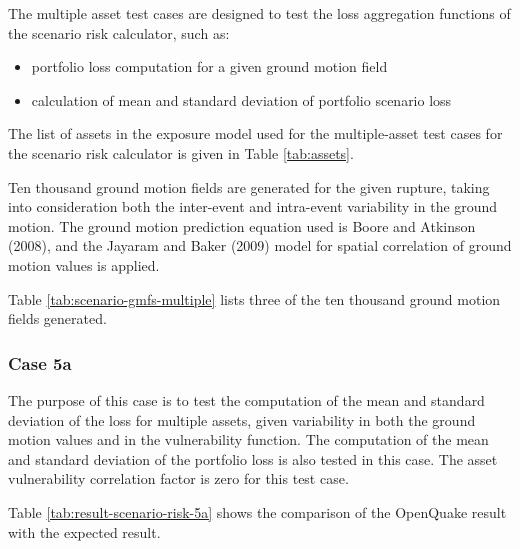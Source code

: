 The multiple asset test cases are designed to test the loss aggregation functions of the scenario risk calculator, such as:

\begin{itemize}
\item portfolio loss computation for a given ground motion field
\item calculation of mean and standard deviation of portfolio scenario loss
\end{itemize}



The list of assets in the exposure model used for the multiple-asset test cases for the scenario risk calculator is given in Table \ref{tab:assets}.

Ten thousand ground motion fields are generated for the given rupture, taking into consideration both the inter-event and intra-event variability in the ground motion. The ground motion prediction equation used is Boore and Atkinson (2008), and the Jayaram and Baker (2009) model for spatial correlation of ground motion values is applied.



Table \ref{tab:scenario-gmfs-multiple} lists three of the ten thousand ground motion fields generated.

\subsubsection{Case 5a}
The purpose of this case is to test the computation of the mean and standard deviation of the loss for multiple assets, given variability in both the ground motion values and in the vulnerability function. The computation of the mean and standard deviation of the portfolio loss is also tested in this case. The asset vulnerability correlation factor is zero for this test case.




Table \ref{tab:result-scenario-risk-5a} shows the comparison of the OpenQuake result with the expected result.

